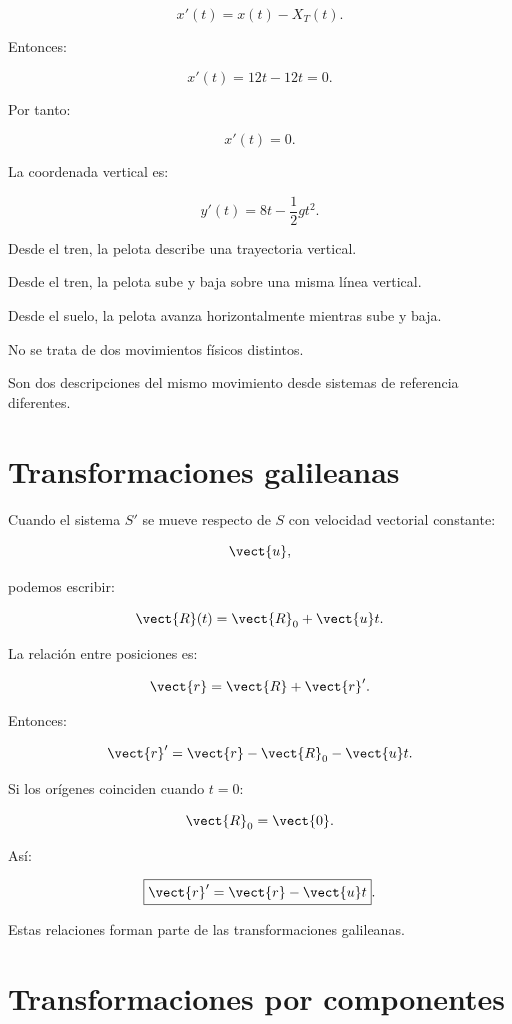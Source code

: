 \[
x'(t)=x(t)-X_T(t).
\]

Entonces:

\[
x'(t)=12t-12t=0.
\]

Por tanto:

\[
\boxed{
x'(t)=0
}.
\]

La coordenada vertical es:

\[
\boxed{
y'(t)=8t-\frac12gt^2
}.
\]

Desde el tren, la pelota describe
una trayectoria vertical.

\begin{interpretacion}

Desde el tren, la pelota sube y baja
sobre una misma línea vertical.

Desde el suelo, la pelota avanza
horizontalmente mientras sube y baja.

No se trata de dos movimientos físicos distintos.

Son dos descripciones del mismo movimiento
desde sistemas de referencia diferentes.

\end{interpretacion}


\section{Transformaciones galileanas}

Cuando el sistema \(S'\) se mueve respecto de \(S\)
con velocidad vectorial constante:

\[
\vect{u},
\]

podemos escribir:

\[
\vect{R}(t)=\vect{R}_0+\vect{u}t.
\]

La relación entre posiciones es:

\[
\vect{r}=\vect{R}+\vect{r}'.
\]

Entonces:

\[
\vect{r}'
=
\vect{r}-\vect{R}_0-\vect{u}t.
\]

Si los orígenes coinciden cuando \(t=0\):

\[
\vect{R}_0=\vect{0}.
\]

Así:

\[
\boxed{
\vect{r}'=\vect{r}-\vect{u}t
}.
\]

Estas relaciones forman parte de las
transformaciones galileanas.


\section{Transformaciones por componentes}

